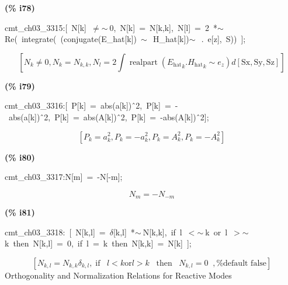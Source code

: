 \documentclass[fleqn]{article}
\begin{document}
\noindent
\begin{minipage}[t]{4.000000em}\color{red}\bfseries
(\% i78)	
\end{minipage}
\begin{minipage}[t]{\textwidth}\color{blue}
cmt\_ch03\_3315:[\ N[k]\ \ensuremath{\neq}\ensuremath{\sim\ }0,\ N[k]\ =\ N[k,k],\ N[l]\ =\ 2\ *\ensuremath{\sim\ }Re(\ integrate(\ (conjugate(E\_hat[k])\ \ensuremath{\sim\ }\ H\_hat[k])\ensuremath{\sim\ }\ .\ e[z],\ S))\ ];
\end{minipage}
\[\displaystyle \tag{cmt\_ ch03\_ 3315} 
\left[ {N_k}\operatorname{\neq }0\operatorname{,}{N_k}={N_{k,k}}\operatorname{,}{N_l}=2 \int {\left. \operatorname{realpart}\left( {{{E_{\ensuremath{\mathrm{hat}}}}}_k}\ensuremath{\mathrm{ . }}{{{H_{\ensuremath{\mathrm{hat}}}}}_k}\operatorname{\sim  }{e_z}\right) d\left[ \ensuremath{\mathrm{Sx}}\operatorname{,}\ensuremath{\mathrm{Sy}}\operatorname{,}\ensuremath{\mathrm{Sz}}\right] \right.}\right] \mbox{}
\]


\noindent
\begin{minipage}[t]{4.000000em}\color{red}\bfseries
(\% i79)	
\end{minipage}
\begin{minipage}[t]{\textwidth}\color{blue}
cmt\_ch03\_3316:[\ P[k]\ =\ abs(a[k])\^\ 2,\ P[k]\ =\ -\ abs(a[k])\^\ 2,\ P[k]\ =\ abs(A[k])\^\ 2,\ P[k]\ =\ -abs(A[k])\^\ 2];
\end{minipage}
\[\displaystyle \tag{cmt\_ ch03\_ 3316} 
\left[ {P_k}={{a}_{k}^{2}}\operatorname{,}{P_k}=-{{a}_{k}^{2}}\operatorname{,}{P_k}={{A}_{k}^{2}}\operatorname{,}{P_k}=-{{A}_{k}^{2}}\right] \mbox{}
\]


\noindent
\begin{minipage}[t]{4.000000em}\color{red}\bfseries
(\% i80)	
\end{minipage}
\begin{minipage}[t]{\textwidth}\color{blue}
cmt\_ch03\_3317:N[m]\ =\ -N[-m];
\end{minipage}
\[\displaystyle \tag{cmt\_ ch03\_ 3317} 
{N_m}=-{N_{-m}}\mbox{}
\]


\noindent
\begin{minipage}[t]{4.000000em}\color{red}\bfseries
(\% i81)	
\end{minipage}
\begin{minipage}[t]{\textwidth}\color{blue}
cmt\_ch03\_3318:\ [\ N[k,l]\ =\ \ensuremath{\delta}[k,l]\ *\ensuremath{\sim\ }N[k,k],\ if\ l\ \ensuremath{<}\ensuremath{\sim\ }k\ or\ l\ \ensuremath{>}\ensuremath{\sim\ }k\ then\ N[k,l]\ =\ 0,\ if\ l\ =\ k\ then\ N[k,k]\ =\ N[k]\ ];
\end{minipage}
\[\displaystyle \tag{cmt\_ ch03\_ 3318} 
\left[ {N_{k,l}}={N_{k,k}} {{\delta }_{k,l}}\operatorname{,}\operatorname{if}\operatorname{ }l\operatorname{<  }k\ensuremath{\mathrm{ or }}l\operatorname{>  }k\operatorname{ }\operatorname{then}\operatorname{ }{N_{k,l}}=0\operatorname{ }\operatorname{,}\mbox{%
false}\right] \mbox{}
\]
Orthogonality and Normalization Relations for Reactive Modes
\end{document}
